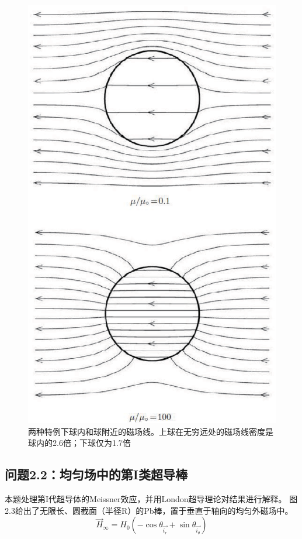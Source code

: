 \begin{figure}
  \centering
 \includegraphics[scale=0.4]{chpt2/figs/fig2.2.eps}
  \caption{两种特例下球内和球附近的磁场线。上球在无穷远处的磁场线密度是球内的2.6倍；下球仅为1.7倍}
\end{figure}

\subsection{问题2.2：均匀场中的第I类超导棒}
本题处理第I代超导体的Meissner效应，并用London超导理论对结果进行解释。
图2.3给出了无限长、圆截面（半径R）的Pb棒，置于垂直于轴向的均匀外磁场中。
\begin{equation*}\label{eqn:2.40}
  \vec{H}_\infty = H_0 (-\cos \theta_{\vec{i_r}}+\sin\theta_{\vec{i_\theta}})
\end{equation*}

